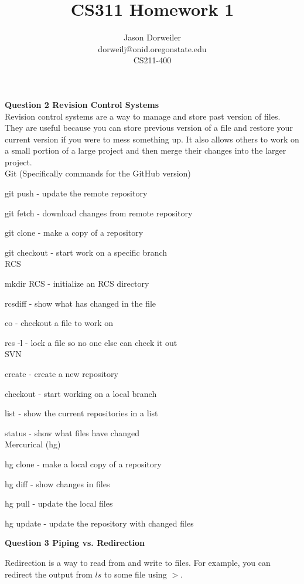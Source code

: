 \documentclass[10pt,a4paper]{article}
\title{CS311 Homework 1}
\author{Jason Dorweiler\\
	dorweilj@onid.oregonstate.edu\\
	CS211-400}
\begin{document}
\maketitle
\textbf{Question 2 Revision Control Systems }\\

Revision control systems are a way to manage and store past version of files.
They are useful because you can store previous version of a file and restore your current version if you were to mess something up.  It also allows others to work on a small portion of a large project and then merge their changes into the larger project.  \\

Git (Specifically commands for the GitHub version)

git push - update the remote repository

git fetch - download changes from remote repository

git clone - make a copy of a repository

git checkout - start work on a specific branch\\

RCS

mkdir RCS - initialize an RCS directory

rcsdiff - show what has changed in the file

co - checkout a file to work on

rcs -l - lock a file so no one else can check it out\\

SVN

create - create a new repository

checkout - start working on a local branch

list - show the current repositories in a list

status - show what files have changed\\

Mercurical (hg)

hg clone - make a local copy of a repository

hg diff - show changes in files

hg pull - update the local files

hg update - update the repository with changed files
\pagebreak

\textbf{Question 3 Piping vs. Redirection}

Redirection is a way to read from and write to files.  For example, you can redirect the output from $ls$ to some file using $>$.\\
\end{document}
